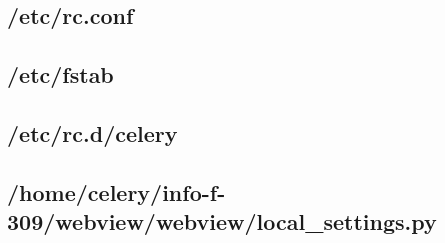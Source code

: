 \documentclass[10pt,a4paper]{article}
\begin{document}
\begin{appendices}
  \subsection{/etc/rc.conf}
  \label{subs:etc-rc-conf}
  

  \subsection{/etc/fstab}
  \label{subs:etc-fstab}
  

  \subsection{/etc/rc.d/celery}
  \label{subs:etc-rcd-celery}
  

  \subsection{/home/celery/info-f-309/webview/webview/local\_settings.py}
  \label{subs:webview-local-settings}
  
\end{appendices}
\end{document}
